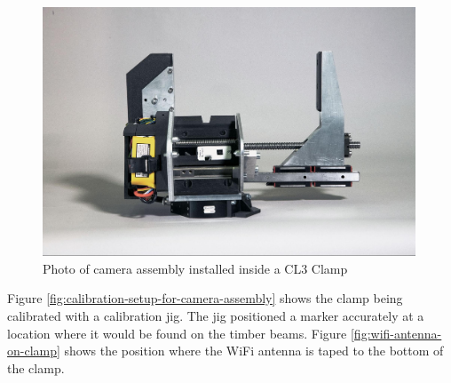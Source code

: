 \begin{figure}[!h]
    \centering
    \includegraphics[width=0.99\textwidth]{images/08/img16.jpg}
    \caption{Photo of camera assembly installed inside a CL3 Clamp}
    \label{fig:camera-assembly-inside-a-cl3-clamp}
\end{figure}


Figure \ref{fig:calibration-setup-for-camera-assembly} shows the clamp being calibrated with a calibration jig. The jig positioned a marker accurately at a location where it would be found on the timber beams. Figure \ref{fig:wifi-antenna-on-clamp} shows the position where the WiFi antenna is taped to the bottom of the clamp.

